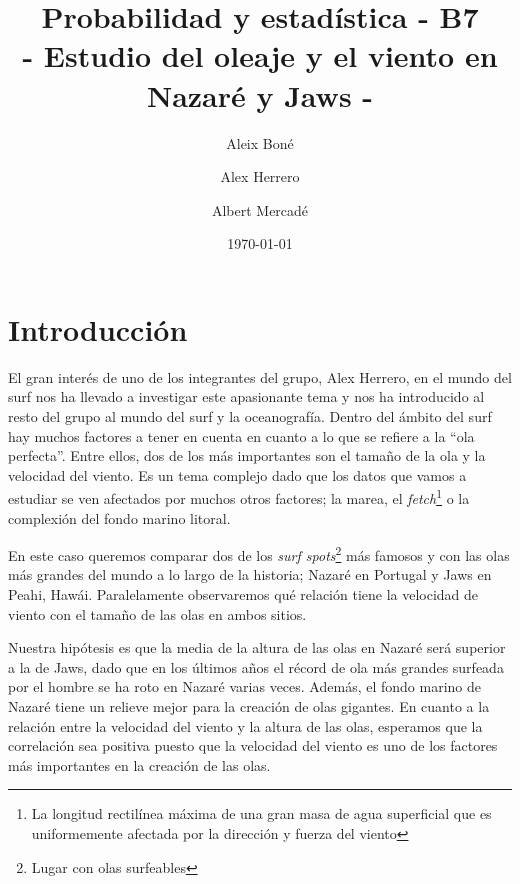 

\geometry{margin=1in}

\title{
   Probabilidad y estadística - B7 \\
   \large 
   - Estudio del oleaje y el viento en Nazaré y Jaws -
}
\author{
  Aleix Boné \and
  Alex Herrero \and
  Albert Mercadé
}
\date{
  \today
}


\maketitle

\begin{abstract}
\end{abstract}

\section{Introducción}%
\label{sec:introduccion}
El gran interés de uno de los integrantes del grupo, Alex Herrero, en el mundo del surf nos ha llevado a investigar este apasionante tema y nos ha introducido al resto del grupo al mundo del surf y la oceanografía. Dentro del ámbito del surf hay muchos factores a tener en cuenta en cuanto a lo que se refiere a la ``ola perfecta''. Entre ellos, dos de los más importantes son el tamaño de la ola y la velocidad del viento. Es un tema complejo dado que los datos que vamos a estudiar se ven afectados por muchos otros factores; la marea, el \textit{fetch}\footnote{La longitud rectilínea máxima de una gran masa de agua superficial que es uniformemente afectada por la dirección y fuerza del viento} o la complexión del fondo marino litoral.

En este caso queremos comparar dos de los \textit{surf spots}\footnote{Lugar con olas surfeables} más famosos y con las olas más grandes del mundo a lo largo de la historia; Nazaré en Portugal y Jaws en Peahi, Hawái. Paralelamente observaremos qué relación tiene la velocidad de viento con el tamaño de las olas en ambos sitios.

Nuestra hipótesis es que la media de la altura de las olas en Nazaré será superior a la de Jaws, dado que en los últimos años el récord de ola más grandes surfeada por el hombre se ha roto en Nazaré varias veces. Además, el fondo marino de Nazaré tiene un relieve mejor para la creación de olas gigantes. En cuanto a la relación entre la velocidad del viento y la altura de las olas, esperamos que la correlación sea positiva
puesto que la velocidad del viento es uno de los factores más importantes en la creación de las olas.

